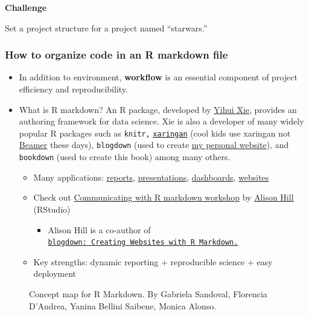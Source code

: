 \documentclass[
]{book}
\providecommand{\tightlist}{%
  \setlength{\itemsep}{0pt}\setlength{\parskip}{0pt}}
\begin{document}
\textbf{Challenge}

Set a project structure for a project named ``starwars.''

\subsubsection{How to organize code in an R markdown file}\label{how-to-organize-code-in-an-r-markdown-file}

\begin{itemize}
\item
  In addition to environment, \textbf{workflow} is an essential component of project efficiency and reproducibility.
\item
  What is R markdown? An R package, developed by \href{https://yihui.org/en/}{Yihui Xie}, provides an authoring framework for data science. Xie is also a developer of many widely popular R packages such as \texttt{knitr,} \href{https://GitHub.com/yihui/xaringan}{\texttt{xaringan}} (cool kids use xaringan not \href{https://en.wikipedia.org/wiki/Beamer_(LaTeX)}{Beamer} these days), \texttt{blogdown} (used to create \href{https://jaeyk.GitHub.io/}{my personal website}), and \texttt{bookdown} (used to create this book) among many others.

  \begin{itemize}
  \tightlist
  \item
    Many applications: \href{https://rstudio.GitHub.io/distill/basics.html}{reports}, \href{https://bookdown.org/yihui/rmarkdown/xaringan.html}{presentations}, \href{https://rmarkdown.rstudio.com/flexdashboard/}{dashboards}, \href{https://bookdown.org/yihui/rmarkdown/websites.html}{websites}
  \item
    Check out \href{https://ysc-rmarkdown.netlify.app/}{Communicating with R markdown workshop} by \href{https://alison.rbind.io/}{Alison Hill} (RStudio)

    \begin{itemize}
    \tightlist
    \item
      Alison Hill is a co-author of \href{https://bookdown.org/yihui/blogdown/}{\texttt{blogdown:\ Creating\ Websites\ with\ R\ Markdown.}}
    \end{itemize}
  \item
    Key strengths: dynamic reporting + reproducible science + easy deployment
  \end{itemize}
\end{itemize}

\begin{figure}
\centering

\caption{Concept map for R Markdown. By Gabriela Sandoval, Florencia D'Andrea, Yanina Bellini Saibene, Monica Alonso.}
\end{figure}
\end{document}
